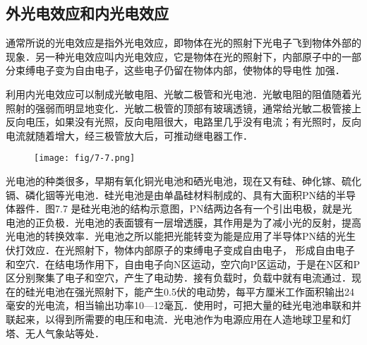 \subsection{外光电效应和内光电效应}

通常所说的光电效应是指外光电效应，即物体在光的照射下光电子飞到物体外部的现象．另一种光电效应叫内光电效应，它是物体在光的照射下，内部原子中的一部分束缚电子变为自由电子，这些电子仍留在物体内部，使物体的导电性
加强．

利用内光电效应可以制成光敏电阻、光敏二极管和光电池．光敏电阻的阻值随着光照射的强弱而明显地变化．光敏二极管的顶部有玻璃透镜，通常给光敏二极管接上反向电压，如果没有光照，反向电阻很大，电路里几乎没有电流；有光照时，反向电流就随着增大，经三极管放大后，可推动继电器工作．

\begin{figure}[htp]
    \centering
\texttt{[image: fig/7-7.png]}
    \caption{}
\end{figure}

光电池的种类很多，早期有氧化铜光电池和硒光电池，现在又有硅、砷化镓、硫化镉、磷化铟等光电池．硅光电池是由单晶硅材料制成的、具有大面积PN结的半导体器件．图7.7
是硅光电池的结构示意图，PN结两边各有一个引出电极，就是光电池的正负极．光电池的表面镀有一层增透膜，其作用是为了减小光的反射，提高光电池的转换效率．光电池之所以能把光能转变为能是应用了半导体PN结的光生伏打效应．在光照射下，物体内部原子的束缚电子变成自由电子，
形成自由电子和空穴．在结电场作用下，自由电子向N区运动，空穴向P区运动，于是在N区和P区分别聚集了电子和空穴，产生了电动势．接有负载时，负载中就有电流通过．现在的硅光电池在强光照射下，能产生0.5伏的电动势，每平方厘米工作面积输出24毫安的光电流，相当输出功率10—12毫瓦．使用时，可把大量的硅光电池串联和并联起来，以得到所需要的电压和电流．光电池作为电源应用在人造地球卫星和灯塔、无人气象站等处．









